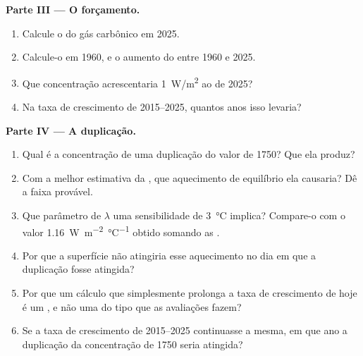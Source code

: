 \begin{problem}
\medskip
\noindent\textbf{Parte III --- O forçamento.}
\begin{enumerate}[resume]
  \item Calcule o  do gás carbônico em 2025.
  \item Calcule-o em 1960, e o aumento do  entre 1960 e 2025.
  \item Que concentração acrescentaria \qty{1}{W/m^2} ao  de
        2025?
  \item Na taxa de crescimento de 2015--2025, quantos anos isso levaria?
\end{enumerate}

\medskip
\noindent\textbf{Parte IV --- A duplicação.}
\begin{enumerate}[resume]
  \item Qual é a concentração de uma duplicação do valor de 1750? Que
         ela produz?
  \item Com a melhor estimativa da ,
        que aquecimento de equilíbrio ela causaria? Dê a faixa provável.
  \item Que parâmetro de  $\lambda$ uma sensibilidade de
        \qty{3}{\degreeCelsius} implica? Compare-o com o valor
        \qty{1.16}{W.m^{-2}.\degreeCelsius^{-1}} obtido somando as
        .
  \item Por que a superfície não atingiria esse aquecimento no dia em que a
        duplicação fosse atingida?
  \item Por que um cálculo que simplesmente prolonga a taxa de crescimento
        de hoje é um , e não uma  do tipo que as avaliações
        fazem?
  \item Se a taxa de crescimento de 2015--2025 continuasse a mesma, em que
        ano a duplicação da concentração de 1750 seria atingida?
\end{enumerate}
\end{problem}
